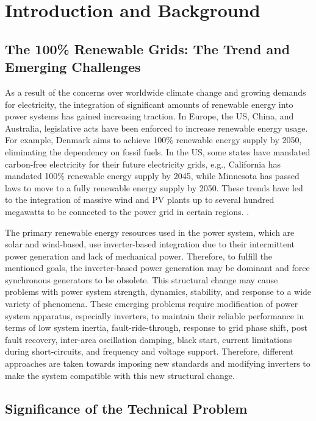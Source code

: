 \chapter{Introduction and Background}

\section{The 100\% Renewable Grids: The Trend and Emerging Challenges}

As a result of the concerns over worldwide climate change and growing demands for electricity, the integration of significant amounts of renewable energy into power systems has gained increasing traction. In Europe, the US, China, and Australia, legislative acts have been enforced to increase renewable energy usage. For example, Denmark aims to achieve 100\% renewable energy supply by 2050, eliminating the dependency on fossil fuels. In the US, some states have mandated carbon-free electricity for their future electricity grids, e.g., California has mandated 100\% renewable energy supply by 2045, while Minnesota has passed laws to move to a fully renewable energy supply by 2050. These trends have led to the integration of massive wind and \gls{PV} plants up to several hundred megawatts to be connected to the power grid in certain regions. \cite{Saeedifard}. 

The primary renewable energy resources used in the power system, which are solar and wind-based, use inverter-based integration due to their intermittent power generation and lack of mechanical power. Therefore, to fulfill the mentioned goals, the inverter-based power generation may be dominant and force synchronous generators to be obsolete. This structural change may cause problems with power system strength, dynamics, stability, and response to a wide variety of phenomena. These emerging problems require modification of power system apparatus, especially inverters, to maintain their reliable performance in terms of low system inertia, fault-ride-through, response to grid phase shift, post fault recovery, inter-area oscillation damping, black start, current limitations during short-circuits, and frequency and voltage support. Therefore, different approaches are taken towards imposing new standards and modifying inverters to make the system compatible with this new structural change.

\section{Significance of the Technical Problem}

